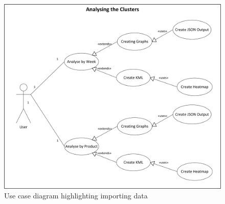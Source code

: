 \begin{figure}[H]
  \centering
    \includegraphics[scale=0.8]{chapter7/use_case/analyse_results.png}
    \caption[Use case diagram highlighting importing data]
            {Use case diagram highlighting importing data}
    \label{fig:UCAnalyseData}
\end{figure}
